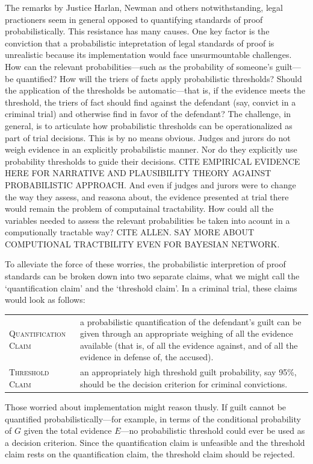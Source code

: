 \documentclass[10pt,dvipsnames,enabledeprecatedfontcommands]{scrartcl}
\begin{document}
The remarks by Justice Harlan, Newman and others notwithstanding, legal
practioners seem in general opposed to quantifying standards of proof
probabilistically. This resistance has many causes. One key factor is
the conviction that a probabilistic intepretation of legal standards of
proof is unrealistic because its implementation would face
unsurmountable challenges. How can the relevant probabilities---such as
the probability of someone's guilt---be quantified? How will the triers
of facts apply probabilistic thresholds? Should the application of the
thresholds be automatic---that is, if the evidence meets the threshold,
the triers of fact should find against the defendant (say, convict in a
criminal trial) and otherwise find in favor of the defendant? The
challenge, in general, is to articulate how probabilistic thresholds can
be operationalized as part of trial decisions. This is by no means
obvious. Judges and jurors do not weigh evidence in an explicitly
probabilistic manner. Nor do they explicitly use probability thresholds
to guide their decisions. CITE EMPIRICAL EVIDENCE HERE FOR NARRATIVE AND
PLAUSIBILITY THEORY AGAINST PROBABILISTIC APPROACH. And even if judges
and jurors were to change the way they assess, and reasona about, the
evidence presented at trial there would remain the problem of
computainal tractability. How could all the variables needed to assess
the relevant probabilities be taken into acount in a computionally
tractable way? CITE ALLEN. SAY MORE ABOUT COMPUTIONAL TRACTBILITY EVEN
FOR BAYESIAN NETWORK.

To alleviate the force of these worries, the probabilistic interpretion
of proof standards can be broken down into two separate claims, what we
might call the `quantification claim' and the `threshold claim'. In a
criminal trial, these claims would look as follows:

\begin{tabular}{lp{8.5cm}}
 \textsc{Quantification Claim} & a probabilistic quantification of the defendant's guilt can 
 be given through an appropriate weighing of all the evidence available (that is, of all the evidence against, and of all the evidence in defense of, the accused).\\
 \textsc{Threshold Claim} & an appropriately high threshold guilt probability, say 95\%, 
 should be the decision criterion for criminal convictions.
  \end{tabular}

\noindent
Those worried about implementation might reason thusly. If guilt cannot
be quantified probabilistically---for example, in terms of the
conditional probability of \(G\) given the total evidence \(E\)---no
probabilistic threshold could ever be used as a decision criterion.
Since the quantification claim is unfeasible and the threshold claim
rests on the quantification claim, the threshold claim should be
rejected.
\end{document}
